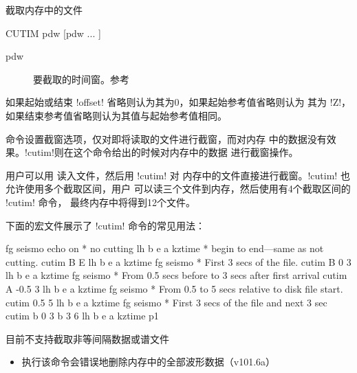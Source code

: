 \label{cmd:cutim}

截取内存中的文件

\begin{SACSTX}
CUTIM pdw [pdw ... ]
\end{SACSTX}

\begin{description}
\item [pdw] 要截取的时间窗。参考 
\end{description}

如果起始或结束 !offset! 省略则认为其为0，如果起始参考值省略则认为
其为 !Z!，如果结束参考值省略则认为其值与起始参考值相同。

 命令设置截窗选项，仅对即将读取的文件进行截窗，而对内存
中的数据没有效果。!cutim!则在这个命令给出的时候对内存中的数据
进行截窗操作。

用户可以用  读入文件，然后用 !cutim! 对
内存中的文件直接进行截窗。!cutim! 也允许使用多个截取区间，用户
可以读三个文件到内存，然后使用有4个截取区间的 !cutim! 命令，
最终内存中将得到12个文件。

下面的宏文件展示了 !cutim! 命令的常见用法：
\begin{SACCode}
fg seismo
echo on
* no cutting
lh b e a kztime
* begin to end---same as not cutting.
cutim B E
lh b e a kztime
fg seismo
* First 3 secs of the file.
cutim B 0 3
lh b e a kztime
fg seismo
* From 0.5 secs before to 3 secs after first arrival
cutim A -0.5 3
lh b e a kztime
fg seismo
* From 0.5 to 5 secs relative to disk file start.
cutim 0.5 5
lh b e a kztime
fg seismo
* First 3 secs of the file and next 3 sec
cutim b 0 3 b 3 6
lh b e a kztime
p1
\end{SACCode}

目前不支持截取非等间隔数据或谱文件

\begin{itemize}
\item 执行该命令会错误地删除内存中的全部波形数据（v101.6a）
\end{itemize}
